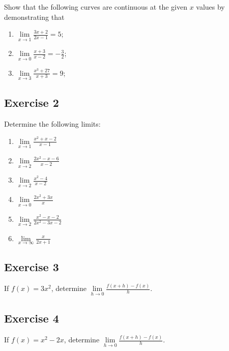 \documentclass[
  11pt,
  oneside]{book}
\providecommand{\tightlist}{%
  \setlength{\itemsep}{0pt}\setlength{\parskip}{0pt}}
\newcommand{\slide}{}
\theoremstyle{definition}
\theoremstyle{definition}
\theoremstyle{definition}
\theoremstyle{definition}
\theoremstyle{remark}
\begin{document}
Show that the following curves are continuous at the given \(x\) values by demonstrating that

\begin{enumerate}
\def\labelenumi{\alph{enumi}.}
\tightlist
\item
  \(\lim\limits_{x\to1}\frac{3x+2}{2x-1} = 5\);
\item
  \(\lim\limits_{x\to0}\frac{x+3}{x-2} = -\frac 32\);
\item
  \(\lim\limits_{x\to3}\frac{x^3+27}{x+3} = 9\);
\end{enumerate}

\slide

\subsection*{Exercise 2}\label{exercise-2}

Determine the following limits:

\begin{enumerate}
\def\labelenumi{\alph{enumi}.}
\tightlist
\item
  \(\lim\limits_{x\to1}\frac{x^2+x-2}{x-1}\)
\item
  \(\lim\limits_{x\to2}\frac{2x^2-x-6}{x-2}\)
\item
  \(\lim\limits_{x\to2}\frac{x^2-4}{x-2}\)
\item
  \(\lim\limits_{x\to0}\frac{2x^2+3x}{x}\)
\item
  \(\lim\limits_{x\to2}\frac{x^2-x-2}{2x^2-3x-2}\)
\item
  \(\lim\limits_{x\to\infty}\frac{x}{2x+1}\)
\end{enumerate}

\slide

\subsection*{Exercise 3}\label{exercise-3}

If \(f(x) = 3x^2\), determine \(\lim\limits_{h\to 0}\frac{f(x+h)-f(x)}{h}\).

\slide

\subsection*{Exercise 4}\label{exercise-4}

If \(f(x) = x^2-2x\), determine \(\lim\limits_{h\to 0}\frac{f(x+h)-f(x)}{h}\).
\slide
\end{document}
